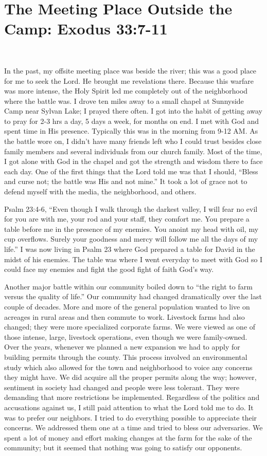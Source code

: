 \documentclass[twoside, 12pt]{book}
\begin{document}
\section{The Meeting Place Outside the Camp: Exodus 33:7-11}
\

In the past, my offsite meeting place was beside the river; this was a good place for me to seek the Lord. He brought me revelations there. Because this warfare was more intense, the Holy Spirit led me completely out of the neighborhood where the battle was. I drove ten miles away to a small chapel at Sunnyside Camp near Sylvan Lake; I prayed there often. I got into the habit of getting away to pray for 2-3 hrs a day, 5 days a week, for months on end. I met with God and spent time in His presence. Typically this was in the morning from 9-12 AM. As the battle wore on, I didn't have many friends left who I could trust besides close family members and several individuals from our church family. Most of the time, I got alone with God in the chapel and got the strength and wisdom there to face each day. One of the first things that the Lord told me was that I should, “Bless and curse not; the battle was His and not mine.” It took a lot of grace not to defend myself with the media, the neighborhood, and others.


Psalm 23:4-6, “Even though I walk through the darkest valley, I will fear no evil for you are with me, your rod and your staff, they comfort me. You prepare a table before me in the presence of my enemies. You anoint my head with oil, my cup overflows. Surely your goodness and mercy will follow me all the days of my life.” I was now living in Psalm 23 where God prepared a table for David in the midst of his enemies. The table was where I went everyday to meet with God so I could face my enemies and fight the good fight of faith God’s way.

Another major battle within our community boiled down to “the right to farm versus the quality of life.” Our community had changed dramatically over the last couple of decades. More and more of the general population wanted to live on acreages in rural areas and then commute to work. Livestock farms had also changed; they were more specialized corporate farms. We were viewed as one of those intense, large, livestock operations, even though we were family-owned. Over the years, whenever we planned a new expansion we had to apply for building permits through the county. This process involved an environmental study which also allowed for the town and neighborhood to voice any concerns they might have. We did acquire all the proper permits along the way; however, sentiment in society had changed and people were less tolerant. They were demanding that more restrictions be implemented. Regardless of the politics and accusations against us, I still paid attention to what the Lord told me to do. It was to prefer our neighbors. I tried to do everything possible to appreciate their concerns. We addressed them one at a time and tried to bless our adversaries. We spent a lot of money and effort making changes at the farm for the sake of the community; but it seemed that nothing was going to satisfy our opponents. 
\end{document}
